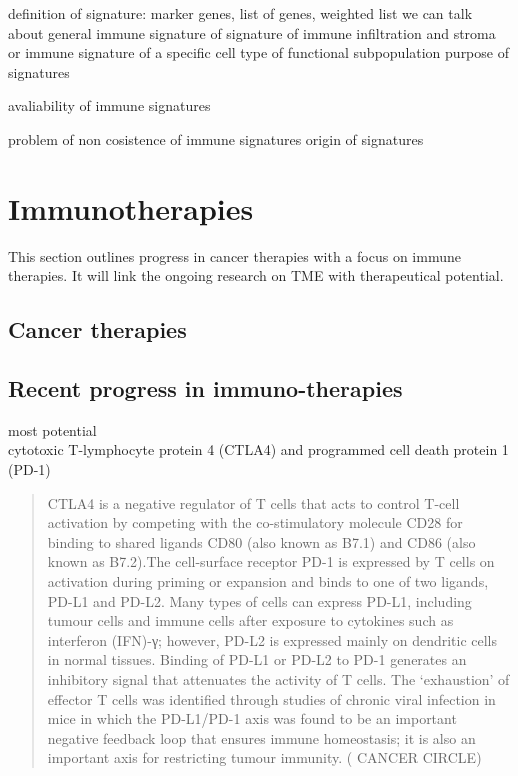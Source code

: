 \documentclass[12pt,]{book}
\theoremstyle{definition}
\theoremstyle{definition}
\theoremstyle{definition}
\theoremstyle{remark}
\begin{document}
definition of signature: marker genes, list of genes, weighted list we
can talk about general immune signature of signature of immune
infiltration and stroma or immune signature of a specific cell type of
functional subpopulation purpose of signatures

avaliability of immune signatures

problem of non cosistence of immune signatures origin of signatures

\hypertarget{immunotherapies}{%
\section{Immunotherapies}\label{immunotherapies}}

This section outlines progress in cancer therapies with a focus on
immune therapies. It will link the ongoing research on TME with
therapeutical potential.

\hypertarget{cancer-therapies}{%
\subsection{Cancer therapies}\label{cancer-therapies}}

\hypertarget{recent-progress-in-immuno-therapies}{%
\subsection{Recent progress in
immuno-therapies}\label{recent-progress-in-immuno-therapies}}

most potential\\
cytotoxic T-lymphocyte protein 4 (CTLA4) and programmed cell death
protein 1 (PD-1)

\begin{quote}
CTLA4 is a negative regulator of T cells that acts to control T-cell
activation by competing with the co-stimulatory molecule CD28 for
binding to shared ligands CD80 (also known as B7.1) and CD86 (also known
as B7.2).The cell-surface receptor PD-1 is expressed by T cells on
activation during priming or expansion and binds to one of two ligands,
PD-L1 and PD-L2. Many types of cells can express PD-L1, including tumour
cells and immune cells after exposure to cytokines such as interferon
(IFN)-γ; however, PD-L2 is expressed mainly on dendritic cells in normal
tissues. Binding of PD-L1 or PD-L2 to PD-1 generates an inhibitory
signal that attenuates the activity of T cells. The `exhaustion' of
effector T cells was identified through studies of chronic viral
infection in mice in which the PD-L1/PD-1 axis was found to be an
important negative feedback loop that ensures immune homeostasis; it is
also an important axis for restricting tumour immunity. (\citet{IMMUNE}
CANCER CIRCLE)
\end{quote}
\end{document}
